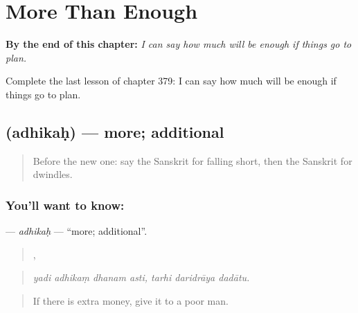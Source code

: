 
\chapter{More Than Enough}
\label{ch:sa-more-than-enough}

\begin{chapteropening}
\textbf{By the end of this chapter:} \emph{I can say how much will be enough if things go to plan.}

Complete the last lesson of chapter 379: I can say how much will be enough if things go to plan.
\end{chapteropening}

\section[\texorpdfstring{\sk{अधिकः} (adhikaḥ)}{अधिकः (adhikaḥ)}]{ (adhikaḥ) — more; additional}

\label{lesson:SA-C379-adhikah}



\begin{quote}
Before the new one: say the Sanskrit for falling short, then the Sanskrit for dwindles.
\end{quote}

\subsection*{You'll want to know: }
\textbf{} — \emph{adhikaḥ} — \textquotedblleft{}more; additional\textquotedblright{}.

\begin{quote}
   ,   
\end{quote}

\begin{quote}
\emph{yadi adhikaṃ dhanam asti, tarhi daridrāya dadātu.}
\end{quote}

\begin{quote}
If there is extra money, give it to a poor man.
\end{quote}

